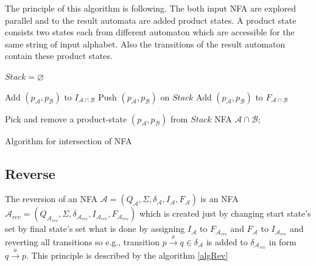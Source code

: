 The principle of this algorithm is following. The both input NFA are explored parallel and to the result automata are added product states. 
A product state consists two states each from different automaton which are accessible for the same string of input alphabet. 
Also the transitions of the result automaton contain these product states.
\\

\begin{algorithm}
	\label{algIntersection}

  $Stack = \varnothing$\;

   {
    Add $(p_\mathcal{A},p_\mathcal{B})$ to $I_{\mathcal{A} \cap \mathcal{B}}$\;
    Push $(p_\mathcal{A},p_\mathcal{B})$ on $Stack$\; 
     {
      Add $(p_\mathcal{A},p_\mathcal{B})$ to $F_{\mathcal{A}\cap\mathcal{B}}$
    }
  }
	
   {
			Pick and remove a product-state $(p_\mathcal{A},p_\mathcal{B})$ from $Stack$\;
	 }
		\Return NFA $\mathcal{A}\cap\mathcal{B}$;
	\caption{Algorithm for intersection of NFA}
\end{algorithm}

\subsection{Reverse}
The reversion of an NFA $\mathcal{A}=(Q_\mathcal{A},\Sigma,\delta_\mathcal{A},I_\mathcal{A},F_\mathcal{A})$ is an NFA 
$\mathcal{A}_{rev}=(Q_{\mathcal{A}_{rev}},\Sigma,\delta_{\mathcal{A}_{rev}},I_{\mathcal{A}_{rev}},F_{\mathcal{A}_{rev}})$ 
which is created just by changing start state's set by final state's set what is done by
assigning $I_\mathcal{A}$ to $F_{\mathcal{A}_{rev}}$ and $F_\mathcal{A}$ to $I_{\mathcal{A}_{rev}}$ and reverting all transitions  so e.g., transition
$p\xrightarrow{x}q \in \delta_\mathcal{A}$ is added to $\delta_{\mathcal{A}_{rev}}$ in form $q\xrightarrow{a}p$. This principle is described by the algorithm
\ref{algRev}
\\

